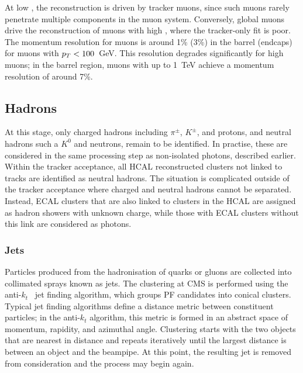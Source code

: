 \noindent At low \pt, the reconstruction is driven by tracker muons, since such muons rarely penetrate multiple components in the muon system. Conversely, global muons drive the reconstruction of muons with high \pt, where the tracker-only fit is poor. The momentum resolution for muons is around 1\% (3\%) in the barrel (endcaps) for muons with $p_T<100$~GeV. This resolution degrades significantly for high \pt muons; in the barrel region, muons with \pt up to 1~TeV achieve a momentum resolution of around 7\%.

\subsection{Hadrons}
\label{subsec:hadrons_and_jets}

At this stage, only charged hadrons including $\pi^{\pm}$, $K^{\pm}$, and protons, and neutral hadrons such a $K^{0}$ and neutrons, remain to be identified. In practise, these are considered in the same processing step as non-isolated photons, described earlier. Within the tracker acceptance, all HCAL reconstructed clusters not linked to tracks are identified as neutral hadrons. The situation is complicated outside of the tracker acceptance where charged and neutral hadrons cannot be separated. Instead, ECAL clusters that are also linked to clusters in the HCAL are assigned as hadron showers with unknown charge, while those with ECAL clusters without this link are considered as photons.

\subsubsection{Jets}


Particles produced from the hadronisation of quarks or gluons are collected into collimated sprays known as jets. The clustering at CMS is performed using the anti-$k_{t}$~\cite{anti-kt} jet finding algorithm, which groups PF candidates into conical clusters. Typical jet finding algorithms define a distance metric between constituent particles; in the anti-$k_{t}$ algorithm, this metric is formed in an abstract space of momentum, rapidity, and azimuthal angle. Clustering starts with the two objects that are nearest in distance and repeats iteratively until the largest distance is between an object and the beampipe. At this point, the resulting jet is removed from consideration and the process may begin again.
    
